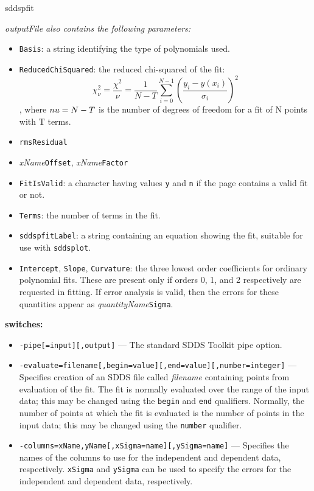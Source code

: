 \begin{sddsprog}{sddspfit}
\begin{itemize}
    \end{itemize}
    \emph{outputFile also contains the following parameters:}
    \begin{itemize}
      \item \verb|Basis|: a string identifying the type of polynomials used.
      \item \verb|ReducedChiSquared|: the reduced chi-squared of the fit:
      $$ \chi^2_\nu = \frac{\chi^2}{\nu} = \frac{1}{N-T}\sum_{i=0}^{N-1} \left(\frac{y_i - y(x_i)}{\sigma_i}\right)^2 $$,
      where $\\nu = N-T$ is the number of degrees of freedom for a fit of N points with T terms.
      \item \verb|rmsResidual|
      \item \emph{xName}\verb|Offset|, \emph{xName}\verb|Factor|
      \item \verb|FitIsValid|: a character having values \verb|y| and \verb|n| if the page contains a valid fit or not.
      \item \verb|Terms|: the number of terms in the fit.
      \item \verb|sddspfitLabel|: a string containing an equation showing the fit, suitable for use with \verb|sddsplot|.
      \item \verb|Intercept|, \verb|Slope|, \verb|Curvature|: the three lowest order coefficients for ordinary polynomial fits. These are present only if orders 0, 1, and 2 respectively are requested in fitting. If error analysis is valid, then the errors for these quantities appear as \emph{quantityName}\verb|Sigma|.
    \end{itemize}
  \item \textbf{switches:}
    \begin{itemize}
      \item \verb|-pipe[=input][,output]| --- The standard SDDS Toolkit pipe option.
      \item \verb|-evaluate=filename[,begin=value][,end=value][,number=integer]| --- Specifies creation of an SDDS file called \emph{filename} containing points from evaluation of the fit. The fit is normally evaluated over the range of the input data; this may be changed using the \verb|begin| and \verb|end| qualifiers. Normally, the number of points at which the fit is evaluated is the number of points in the input data; this may be changed using the \verb|number| qualifier.
      \item \verb|-columns=xName,yName[,xSigma=name][,ySigma=name]| --- Specifies the names of the columns to use for the independent and dependent data, respectively. \verb|xSigma| and \verb|ySigma| can be used to specify the errors for the independent and dependent data, respectively.

\end{itemize}
\end{sddsprog}
